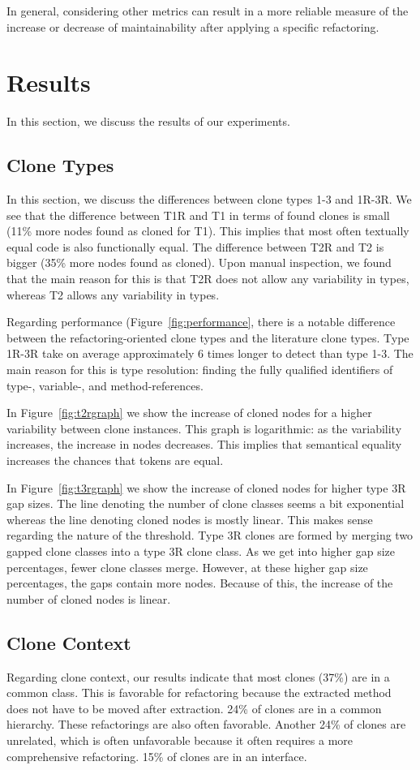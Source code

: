 In general, considering other metrics can result in a more reliable measure of the increase or decrease of maintainability after applying a specific refactoring.

\section{Results}
In this section, we discuss the results of our experiments.

\subsection{Clone Types}
In this section, we discuss the differences between clone types 1-3 and 1R-3R. We see that the difference between T1R and T1 in terms of found clones is small (11\% more nodes found as cloned for T1). This implies that most often textually equal code is also functionally equal. The difference between T2R and T2 is bigger (35\% more nodes found as cloned). Upon manual inspection, we found that the main reason for this is that T2R does not allow any variability in types, whereas T2 allows any variability in types.

Regarding performance (Figure~\ref{fig:performance}, there is a notable difference between the refactoring-oriented clone types and the literature clone types. Type 1R-3R take on average approximately 6 times longer to detect than type 1-3. The main reason for this is type resolution: finding the fully qualified identifiers of type-, variable-, and method-references.

In Figure~\ref{fig:t2rgraph} we show the increase of cloned nodes for a higher variability between clone instances. This graph is logarithmic: as the variability increases, the increase in nodes decreases. This implies that semantical equality increases the chances that tokens are equal.

In Figure~\ref{fig:t3rgraph} we show the increase of cloned nodes for higher type 3R gap sizes. The line denoting the number of clone classes seems a bit exponential whereas the line denoting cloned nodes is mostly linear. This makes sense regarding the nature of the threshold. Type 3R clones are formed by merging two gapped clone classes into a type 3R clone class. As we get into higher gap size percentages, fewer clone classes merge. However, at these higher gap size percentages, the gaps contain more nodes. Because of this, the increase of the number of cloned nodes is linear.

\subsection{Clone Context}
Regarding clone context, our results indicate that most clones (37\%) are in a common class. This is favorable for refactoring because the extracted method does not have to be moved after extraction. 24\% of clones are in a common hierarchy. These refactorings are also often favorable. Another 24\% of clones are unrelated, which is often unfavorable because it often requires a more comprehensive refactoring. 15\% of clones are in an interface.

